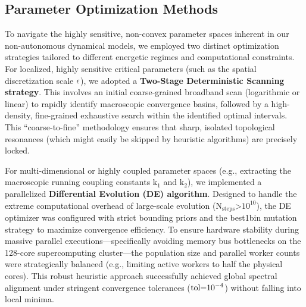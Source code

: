 \documentclass[fractalfract,article,submit,oneauthor,pdftex]{Definitions/mdpi}
\begin{document}
\subsection{Parameter Optimization Methods}

To navigate the highly sensitive, non-convex parameter spaces inherent
in our non-autonomous dynamical models, we employed two distinct
optimization strategies tailored to different energetic regimes and
computational constraints. For localized, highly sensitive critical
parameters (such as the spatial discretization scale \(\text{\ensuremath{\epsilon}}\)), we
adopted a \textbf{Two-Stage Deterministic Scanning strategy}. This
involves an initial coarse-grained broadband scan (logarithmic or
linear) to rapidly identify macroscopic convergence basins, followed by
a high-density, fine-grained exhaustive search within the identified
optimal intervals. This ``coarse-to-fine'' methodology ensures that
sharp, isolated topological resonances (which might easily be skipped by
heuristic algorithms) are precisely locked.

For multi-dimensional or highly coupled parameter spaces (e.g.,
extracting the macroscopic running coupling constants
\(\text{k}_{\text{1}}\) and \(\text{k}_{\text{2}}\)), we implemented a
parallelized \textbf{Differential Evolution (DE) algorithm}. Designed to
handle the extreme computational overhead of large-scale evolution
(\(\text{N}_{\text{steps}}\text{>}\text{10}^{\text{10}}\)), the DE
optimizer was configured with strict bounding priors and the best1bin
mutation strategy to maximize convergence efficiency. To ensure hardware
stability during massive parallel executions---specifically avoiding
memory bus bottlenecks on the 128-core supercomputing cluster---the
population size and parallel worker counts were strategically balanced
(e.g., limiting active workers to half the physical cores). This robust
heuristic approach successfully achieved global spectral alignment under
stringent convergence tolerances (\(\text{tol=}\text{10}^{\text{\ensuremath{-}4}}\))
without falling into local minima.



\vspace{6pt}

\end{document}
